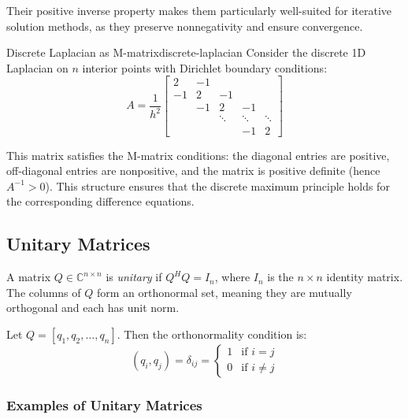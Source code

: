 Their positive inverse property makes them particularly well-suited for iterative solution methods, as they preserve nonnegativity and ensure convergence.

\begin{example}{Discrete Laplacian as M-matrix}{discrete-laplacian}
    Consider the discrete 1D Laplacian on $n$ interior points with Dirichlet boundary conditions:
    \[
        A = \frac{1}{h^2} \begin{bmatrix}
            2  & -1 &        &        &        \\
            -1 & 2  & -1     &        &        \\
               & -1 & 2      & -1     &        \\
               &    & \ddots & \ddots & \ddots \\
               &    &        & -1     & 2
        \end{bmatrix}
    \]

    This matrix satisfies the M-matrix conditions: the diagonal entries are positive, off-diagonal entries are nonpositive, and the matrix is positive definite (hence $A^{-1} > 0$). This structure ensures that the discrete maximum principle holds for the corresponding difference equations.
\end{example}


\subsection{Unitary Matrices}

A matrix $Q \in \mathbb{C}^{n \times n}$ is \emph{unitary} if $Q^H Q = I_n$, where $I_n$ is the $n \times n$ identity matrix. The columns of $Q$ form an orthonormal set, meaning they are mutually orthogonal and each has unit norm.

Let $Q = [q_1, q_2, \ldots, q_n]$. Then the orthonormality condition is:
\begin{equation}
    (q_i, q_j) = \delta_{ij} = \begin{cases}
        1 & \text{if } i = j    \\
        0 & \text{if } i \neq j
    \end{cases}
\end{equation}

\subsubsection{Examples of Unitary Matrices}

